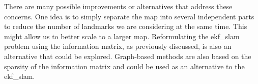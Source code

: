 There are many possible improvements or alternatives that address these concerns. One idea is to simply separate the map into several independent parts to reduce the number of landmarks we are considering at the same time. This might allow us to better scale to a larger map. Reformulating the \acrshort{ekf_slam} problem using the information matrix, as previously discussed, is also an alternative that could be explored. Graph-based methods are also based on the sparsity of the information matrix and could be used as an alternative to the \acrshort{ekf_slam}. 

